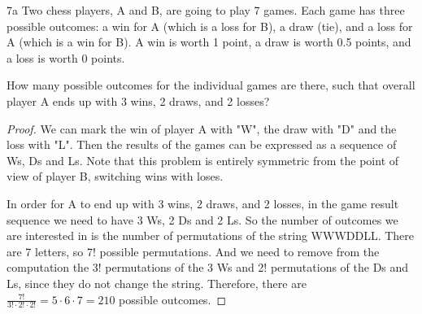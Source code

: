 \begin{exercise}{7a}
Two chess players, A and B, are going to play 7 games. Each game has three possible
outcomes: a win for A (which is a loss for B), a draw (tie), and a loss for A (which is
a win for B). A win is worth 1 point, a draw is worth 0.5 points, and a loss is worth 0
points.

\vspace{1em}
How many possible outcomes for the individual games are there, such that overall
player A ends up with 3 wins, 2 draws, and 2 losses?
\end{exercise}


\begin{proof}
    We can mark the win of player A with "W", the draw with "D" and the loss with "L". Then
    the results of the games can be expressed as a sequence of Ws, Ds and Ls. Note that this problem
    is entirely symmetric from the point of view of player B, switching wins with loses.

    In order for A to end up with 3 wins, 2 draws, and 2 losses, in the game result sequence we need to have
    3 Ws, 2 Ds and 2 Ls. So the number of outcomes we are interested in is the number of permutations of the string
    WWWDDLL. There are 7 letters, so 7! possible permutations. And we need to remove from the computation the 3!
    permutations of the 3 Ws and 2! permutations of the Ds and Ls, since they do not change the string. Therefore,
    there are $\frac{7!}{3! \cdot 2! \cdot 2!} = 5 \cdot 6 \cdot 7 = 210$ possible outcomes.
\end{proof}


